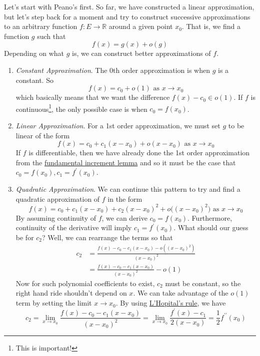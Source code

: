   Let's start with Peano's first. So far, we have constructed a linear approximation, but let's step back for a moment and try to construct successive approximations to an arbitrary function $f: E \to \mathbb{R}$ around a given point $x_0$. That is, we find a function $g$ such that
  \begin{equation}
    f(x) = g(x) + o(g)
  \end{equation}
  Depending on what $g$ is, we can construct better approximations of $f$. 
  \begin{enumerate}
    \item \textit{Constant Approximation}. The 0th order approximation is when $g$ is a constant. So 
      \begin{equation}
        f(x) = c_0 + o(1) \text{ as } x \to x_0
      \end{equation}
      which basically means that we want the difference $f(x) - c_0 \in o(1)$. If $f$ is continuous\footnote{This is important!}, the only possible case is when $c_0 = f(x_0)$.  

		\item \textit{Linear Approximation}. For a 1st order approximation, we must set $g$ to be linear of the form 
      \begin{equation}
        f(x) = c_0 + c_1 (x - x_0) + o(x - x_0) \text{ as } x \to x_0 
      \end{equation}
			If $f$ is differentiable, then we have already done the 1st order approximation from the \hyperref[def:derivative]{fundamental increment lemma} and so it must be the case that $c_0 = f(x_0), c_1 = f^\prime(x_0)$. 

    \item \textit{Quadratic Approximation}. We can continue this pattern to try and find a quadratic approximation of $f$ in the form
      \begin{equation}
        f(x) = c_0 + c_1 (x - x_0) + c_2 (x - x_0)^2 + o\big((x - x_0)^2 \big) \text{ as } x \rightarrow x_0
      \end{equation}
      By assuming continuity of $f$, we can derive $c_0 = f(x_0)$. Furthermore, continuity of the derivative will imply $c_1 = f^\prime (x_0)$. What should our guess be for $c_2$? Well, we can rearrange the terms so that 
      \begin{align}
        c_2 & = \frac{f(x) - c_0 - c_1 (x - x_0) - o ((x - x_0)^2 )}{(x - x_0)^2} \\ 
            & = \frac{f(x) - c_0 - c_1 (x - x_0)}{(x - x_0)^2} - o(1) 
      \end{align}
      Now for such polynomial coefficients to exist, $c_2$ must be constant, so the right hand ride shouldn't depend on $x$. We can take advantage of the $o(1)$ term by setting the limit $x \to x_0$. By using \hyperref[thm:lhopital]{L'Hopital's rule}, we have 
      \begin{equation}
        c_2 = \lim_{x \to x_0} \frac{f(x) - c_0 - c_1 (x - x_0)}{(x - x_0)^2} = \lim_{x \to x_0} \frac{f^\prime (x) - c_1}{2 (x - x_0)} = \frac{1}{2} f^{\prime\prime} (x_0)
      \end{equation}


\end{enumerate}
